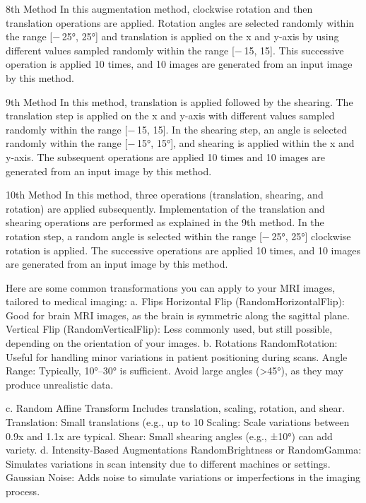 8th Method In this augmentation method, clockwise rotation and then translation operations are applied. Rotation angles are selected randomly within the range [− 25°, 25°] and translation is applied on the x and y-axis by using different values sampled randomly within the range [− 15, 15]. This successive operation is applied 10 times, and 10 images are generated from an input image by this method.

9th Method In this method, translation is applied followed by the shearing. The translation step is applied on the x and y-axis with different values sampled randomly within the range [− 15, 15]. In the shearing step, an angle is selected randomly within the range [− 15°, 15°], and shearing is applied within the x and y-axis. The subsequent operations are applied 10 times and 10 images are generated from an input image by this method.

10th Method In this method, three operations (translation, shearing, and rotation) are applied subsequently. Implementation of the translation and shearing operations are performed as explained in the 9th method. In the rotation step, a random angle is selected within the range [− 25°, 25°] clockwise rotation is applied. The successive operations are applied 10 times, and 10 images are generated from an input image by this method.




Here are some common transformations you can apply to your MRI images, tailored to medical imaging:
a. Flips
Horizontal Flip (RandomHorizontalFlip): Good for brain MRI images, as the brain is symmetric along the sagittal plane.
Vertical Flip (RandomVerticalFlip): Less commonly used, but still possible, depending on the orientation of your images.
b. Rotations
RandomRotation: Useful for handling minor variations in patient positioning during scans.
Angle Range: Typically, 10°–30° is sufficient. Avoid large angles (>45°), as they may produce unrealistic data.

c. Random Affine Transform
Includes translation, scaling, rotation, and shear.
Translation: Small translations (e.g., up to 10%
Scaling: Scale variations between 0.9x and 1.1x are typical.
Shear: Small shearing angles (e.g., ±10°) can add variety.
d. Intensity-Based Augmentations
RandomBrightness or RandomGamma: Simulates variations in scan intensity due to different machines or settings.
Gaussian Noise: Adds noise to simulate variations or imperfections in the imaging process.

